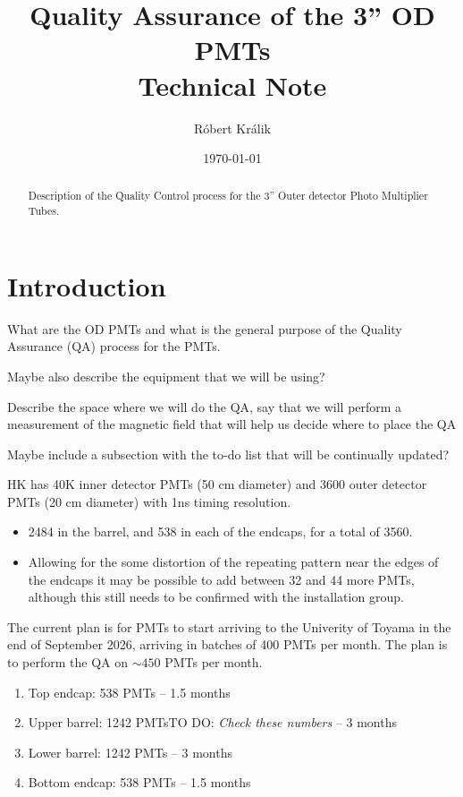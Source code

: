 \documentclass[12pt,a4paper]{article}
\author[1]{Róbert Králik}
\affil[1]{King's College London, UK}
\title{\textbf{Quality Assurance of the 3'' OD PMTs\\ \vspace*{5mm}
\Large{Technical Note}}}
\date{\today}
\newcommand{\todo}[1]{\textcolor{red!90!black}{TO DO: \textit{#1}}}
\begin{document}
\maketitle
\thispagestyle{empty} %
\begin{abstract}
Description of the Quality Control process for the 3'' Outer detector Photo Multiplier Tubes.
\end{abstract}
\newpage

\thispagestyle{empty} %
\tableofcontents
\newpage
{} %

\section{Introduction}

What are the OD PMTs and what is the general purpose of the Quality Assurance (QA) process for the PMTs.

Maybe also describe the equipment that we will be using?

Describe the space where we will do the QA, say that we will perform a measurement of the magnetic field that will help us decide where to place the QA

Maybe include a subsection with the to-do list that will be continually updated?

HK has 40K inner detector PMTs (50 cm diameter) and 3600 outer detector PMTs (20 cm diameter) with 1ns timing resolution.
\begin{itemize}
  \item 2484 in the barrel, and 538 in each of the endcaps, for a total of 3560.
  \item Allowing for the some distortion of the repeating pattern near the edges of the endcaps it may be possible to add between 32 and 44 more PMTs, although this still needs to be confirmed with the installation group. 
\end{itemize}

The current plan is for PMTs to start arriving to the Univerity of Toyama in the end of September 2026, arriving in batches of 400 PMTs per month. The plan is to perform the QA on $\sim 450$ PMTs per month.
\begin{enumerate}
  \item Top endcap: 538 PMTs -- 1.5 months
  \item Upper barrel: 1242 PMTs\todo{Check these numbers} -- 3 months
  \item Lower barrel: 1242 PMTs -- 3 months
  \item Bottom endcap: 538 PMTs -- 1.5 months
\end{enumerate}
\end{document}
